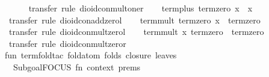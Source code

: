 \begin{isabellebody}
\ \ \ \ \isamarkupfalse%
\ {}transfer{}\ rule\ dioid{}con{}mult{}oner{}\isanewline
\ \ \isamarkupfalse%
\ {}term{}plus\ term{}zero\ x\ {}\ x{}\isanewline
\ \ \ \ \isamarkupfalse%
\ {}transfer{}\ rule\ dioid{}con{}add{}zerol{}\isanewline
\ \ \isamarkupfalse%
\ {}term{}mult\ term{}zero\ x\ {}\ term{}zero{}\isanewline
\ \ \ \ \isamarkupfalse%
\ {}transfer{}\ rule\ dioid{}con{}mult{}zerol{}\isanewline
\ \ \isamarkupfalse%
\ {}term{}mult\ x\ term{}zero\ {}\ term{}zero{}\isanewline
\ \ \ \ \isamarkupfalse%
\ {}transfer{}\ rule\ dioid{}con{}mult{}zeror{}\isanewline
{}\isamarkupfalse%
%
\endisatagproof
{\isafoldproof}%
%
\isadelimproof
\isanewline
%
\endisadelimproof
%
\isadelimML
\isanewline
%
\endisadelimML
%
\isatagML
{}\isamarkupfalse%
\ {}\isanewline
\isanewline
fun\ term{}fold{}tac\ fold{}atom\ folds\ closure\ leaves\ {}\isanewline
\ \ Subgoal{}FOCUS\ {}fn\ {}context{}\ prems{}\ {}{}{}{}\ {}{}\isanewline

\end{isabellebody}
